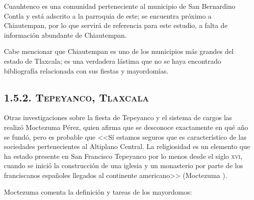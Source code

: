 \documentclass[14pt,letterpaper,twoside]{extbook} %
\begin{document}
\noindent Cuauhtenco es una comunidad perteneciente al municipio de San Bernardino Contla y está adscrito a la parroquia de este; se encuentra próximo a Chiautempan, por lo que servirá de referencia para este estudio, a falta de información abundante de Chiautempan.

Cabe mencionar que Chiautempan es uno de los municipios más grandes del estado de Tlaxcala; es una verdadera lástima que no se haya encontrado bibliografía relacionada con sus fiestas y mayordomías.

\subsection*{\mdseries\large\textsc{1.5.2. Tepeyanco, Tlaxcala}}

\noindent Otras investigaciones sobre la fiesta de Tepeyanco y el sistema de cargos las realizó Moctezuma Pérez, quien afirma que se desconoce exactamente en qué año se fundó, pero es probable que <<Sí estamos seguros que es característico de las sociedades pertenecientes al Altiplano Central. La religiosidad es un elemento que ha estado presente en San Francisco Tepeyanco por lo menos desde el siglo \textsc{xvi}, cuando se inició la construcción de una iglesia y un monasterio por parte de los franciscanos españoles llegados al continente americano>> (Moctezuma ).

Moctezuma comenta la definición y tareas de los mayordomos:
\end{document}
